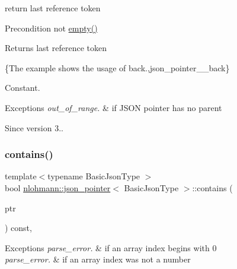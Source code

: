return last reference token 

\begin{DoxyPrecond}{Precondition}
not {\ttfamily \mbox{\hyperlink{classnlohmann_1_1json__pointer_a649252bda4a2e75a0915b11a25d8bcc3}{empty()}}} 
\end{DoxyPrecond}
\begin{DoxyReturn}{Returns}
last reference token
\end{DoxyReturn}
\{The example shows the usage of {\ttfamily back}.,json\+\_\+pointer\+\_\+\+\_\+back\}

Constant.


\begin{DoxyExceptions}{Exceptions}
{\em out\+\_\+of\+\_\+range.} & if J\+S\+ON pointer has no parent\\
\hline
\end{DoxyExceptions}
\begin{DoxySince}{Since}
version 3.. 
\end{DoxySince}
\mbox{\label{classnlohmann_1_1json__pointer_a90d38e45e2d3add52d824bc55da8f772}} 
\subsubsection{\texorpdfstring{contains()}{contains()}}
{\footnotesize\ttfamily template$<$typename Basic\+Json\+Type $>$ \\
bool \mbox{\hyperlink{classnlohmann_1_1json__pointer}{nlohmann\+::json\+\_\+pointer}}$<$ Basic\+Json\+Type $>$\+::contains (\begin{DoxyParamCaption}\item[{const Basic\+Json\+Type $\ast$}]{ptr }\end{DoxyParamCaption}) const\hspace{0.3cm}{\ttfamily [inline]}, {\ttfamily [private]}}


\begin{DoxyExceptions}{Exceptions}
{\em parse\+\_\+error.} & if an array index begins with \textquotesingle{}0\textquotesingle{} \\
\hline
{\em parse\+\_\+error.} & if an array index was not a number \\
\hline
\end{DoxyExceptions}
\mbox{\label{classnlohmann_1_1json__pointer_a649252bda4a2e75a0915b11a25d8bcc3}} 
